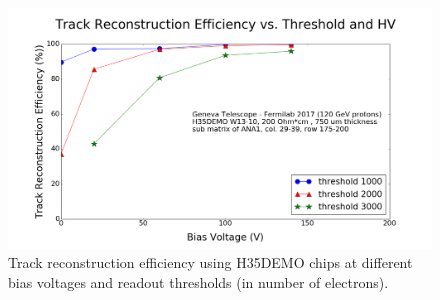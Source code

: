 \begin{figure}[htbp]
    \centering
    \includegraphics[width=\linewidth]{Images/Other/H35DEMO_efficiency.png}
    \caption{Track reconstruction efficiency using H35DEMO chips at different bias voltages and readout thresholds (in number of electrons).}
    \label{fig:H35DEMO_efficiency}
\end{figure}